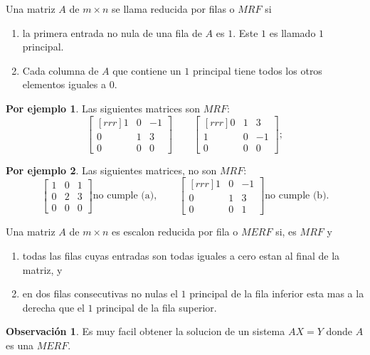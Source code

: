 \documentclass{article}
\theoremstyle{definition}
\theoremstyle{definition}
\newtheorem*{obs}{Observación}
\newtheorem*{ej}{Por ejemplo}
\theoremstyle{remark}
\begin{document}
\begin{defi}
Una matriz $A$ de $m \times n$ se llama reducida por filas o $MRF$ si \begin{enumerate}[label=\textcolor{azulp2}{(\alph*)}]
    \item  la primera entrada no nula de una fila de $A$ es $1$. Este $1$ es llamado $1$ principal.
    \item  Cada columna de $A$ que contiene un $1$ principal tiene todos los otros elementos iguales a $0$.
 \end{enumerate}
\end{defi}
\begin{ej}
  Las siguientes matrices son $MRF$: \[
    \begin{bmatrix}[rrr] 1 & 0 & -1 \\ 0 & 1 & 3 \\ 0 & 0 & 0 \end{bmatrix} \quad \quad \begin{bmatrix}[rrr] 0 & 1 & 3 \\ 1 & 0 & -1 \\ 0 & 0 & 0 \end{bmatrix} ;
  \]
\end{ej}
\begin{ej}
  Las siguientes matrices, no son $MRF$: \[
    \begin{bmatrix} 1 & 0 & 1 \\ 0 & 2 & 3 \\ 0 & 0 & 0 \end{bmatrix} \text{no cumple (a)}, \quad \quad \begin{bmatrix}[rrr] 1 & 0 & -1 \\ 0 & 1 & 3 \\ 0 & 0 & 1 \end{bmatrix} \text{no cumple (b).}
  \]
\end{ej}
\begin{defi}
  Una matriz $A$ de $m \times n$ es escalon reducida por fila o $MERF$ si, es $MRF$ y 
\begin{enumerate}[label = \textcolor{azulp2}{(\alph*)}, start=3]    \item todas las filas cuyas entradas son todas iguales a cero estan al final de la matriz, y 
  \item en dos filas consecutivas no nulas el $1$ principal de la fila inferior esta mas a la derecha que el $1$ principal de la fila superior.
 \end{enumerate}
\end{defi}
\begin{obs}
  Es muy facil obtener la solucion de un sistema $AX=Y$ donde $A$ es una $MERF$. 
\end{obs}
\end{document}
